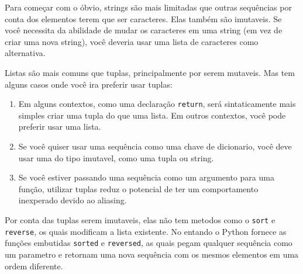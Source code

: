
Para começar com o óbvio, strings são mais limitadas que outras
sequências por conta dos elementos terem que ser caracteres. Elas
também são imutaveis. Se você necessita da abilidade de mudar os
caracteres em uma string (em vez de criar uma nova string), você 
deveria usar uma lista de caracteres como alternativa.

Listas são mais comuns que tuplas, principalmente por serem mutaveis.
Mas tem alguns casos onde você ira preferir usar tuplas:

\begin{enumerate}

\item Em alguns contextos, como uma declaração {\tt return}, será
sintaticamente mais simples criar uma tupla do que uma lista. Em 
outros contextos, você pode preferir usar uma lista.

\item Se você quiser usar uma sequência como uma chave de dicionario,
você deve usar uma do tipo imutavel, como uma tupla ou string.

\item Se você estiver passando uma sequência como um argumento para
uma função, utilizar tuplas reduz o potencial de ter um comportamento
inexperado devido ao aliasing.

\end{enumerate}

Por conta das tuplas serem imutaveis, elas não tem metodos como o
{\tt sort} e {\tt reverse}, os quais modificam a lista existente.
No entando o Python fornece as funções embutidas {\tt sorted}
e {\tt reversed}, as quais pegam qualquer sequência como um parametro
e retornam uma nova sequência com os mesmos elementos em uma ordem
diferente.

